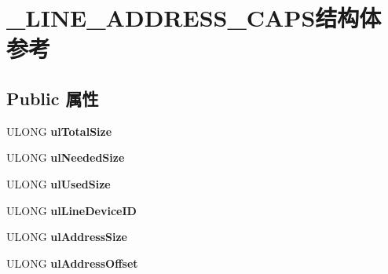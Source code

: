 \hypertarget{struct___l_i_n_e___a_d_d_r_e_s_s___c_a_p_s}{}\section{\+\_\+\+L\+I\+N\+E\+\_\+\+A\+D\+D\+R\+E\+S\+S\+\_\+\+C\+A\+P\+S结构体 参考}
\label{struct___l_i_n_e___a_d_d_r_e_s_s___c_a_p_s}
\subsection*{Public 属性}
\begin{DoxyCompactItemize}
\item 
\mbox{\label{struct___l_i_n_e___a_d_d_r_e_s_s___c_a_p_s_afc97269a71683d80af2882af0d611130}} 
U\+L\+O\+NG {\bfseries ul\+Total\+Size}
\item 
\mbox{\label{struct___l_i_n_e___a_d_d_r_e_s_s___c_a_p_s_a580ff8efbecacabfe26b836d66b972dc}} 
U\+L\+O\+NG {\bfseries ul\+Needed\+Size}
\item 
\mbox{\label{struct___l_i_n_e___a_d_d_r_e_s_s___c_a_p_s_a20939a4ce11f3e2631405eb259f164ef}} 
U\+L\+O\+NG {\bfseries ul\+Used\+Size}
\item 
\mbox{\label{struct___l_i_n_e___a_d_d_r_e_s_s___c_a_p_s_a5571c98300fb5cb54b704068a2ed4bea}} 
U\+L\+O\+NG {\bfseries ul\+Line\+Device\+ID}
\item 
\mbox{\label{struct___l_i_n_e___a_d_d_r_e_s_s___c_a_p_s_a8a80daf49e4b551565e0441b9f57882f}} 
U\+L\+O\+NG {\bfseries ul\+Address\+Size}
\item 
\mbox{\label{struct___l_i_n_e___a_d_d_r_e_s_s___c_a_p_s_a44dbba2532248766a200cd58869277ec}} 
U\+L\+O\+NG {\bfseries ul\+Address\+Offset}
\item 
\mbox{\label{struct___l_i_n_e___a_d_d_r_e_s_s___c_a_p_s_ae50bf4ef9b5af7375a1dd9ca53e99180}} 

\end{DoxyCompactItemize}
